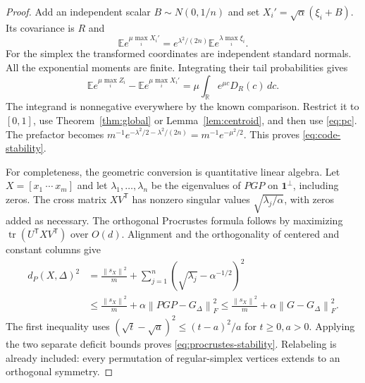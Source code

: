 \documentclass[11pt]{article}
\theoremstyle{remark}\newtheorem{remark}[theorem]{Remark}
\newcommand{\R}{\mathbb R}
\newcommand{\E}{\mathbb E}
\newcommand{\one}{\mathbf 1}
\newcommand{\tr}{\operatorname{tr}}
\newcommand{\norm}[1]{\left\lVert#1\right\rVert}
\begin{document}
\begin{proof}
Add an independent scalar $B\sim N(0,1/n)$ and set
$X_i'=\sqrt\alpha(\xi_i+B)$. Its covariance is $R$ and
\[
 \E e^{\mu\max_i X_i'}=e^{\lambda^2/(2n)}\E e^{\lambda\max_i\xi_i}.
\]
For the simplex the transformed coordinates are independent standard normals.
All the exponential moments are finite. Integrating their tail probabilities gives
\[
 \E e^{\mu\max_i Z_i}-\E e^{\mu\max_i X_i'}
 =\mu\int_{\R}e^{\mu c}D_R(c)\,dc.
\]
The integrand is nonnegative everywhere by the known comparison. Restrict it
to $[0,1]$, use Theorem~\ref{thm:global} or Lemma~\ref{lem:centroid}, and then
use \eqref{eq:pc}. The prefactor becomes
$m^{-1}e^{-\lambda^2/2-\lambda^2/(2n)}=m^{-1}e^{-\mu^2/2}$.
This proves \eqref{eq:code-stability}.

For completeness, the geometric conversion is quantitative linear algebra.
Let $X=[x_1\ \cdots\ x_m]$ and let $\lambda_1,\ldots,\lambda_n$ be the
eigenvalues of $PGP$ on $\one^\perp$, including zeros. The cross matrix $XV^{\mathsf T}$ has nonzero singular values
$\sqrt{\lambda_j/\alpha}$, with zeros added as necessary.
The orthogonal Procrustes formula follows by maximizing
$\tr(U^{\mathsf T}XV^{\mathsf T})$ over $O(d)$.
Alignment and the orthogonality of centered and constant columns give
\begin{align*}
 d_P(X,\Delta)^2
 &=\frac{\norm{s_X}^2}{m}
       +\sum_{j=1}^n(\sqrt{\lambda_j}-\alpha^{-1/2})^2\\
 &\le\frac{\norm{s_X}^2}{m}
       +\alpha\norm{PGP-G_\Delta}_F^2
 \le\frac{\norm{s_X}^2}{m}+\alpha\norm{G-G_\Delta}_F^2.
\end{align*}
The first inequality uses
$(\sqrt t-\sqrt a)^2\le(t-a)^2/a$ for $t\ge0,a>0$.
Applying the two separate deficit bounds proves \eqref{eq:procrustes-stability}.
Relabeling is already included: every permutation of regular-simplex vertices
extends to an orthogonal symmetry.
\end{proof}
\end{document}

